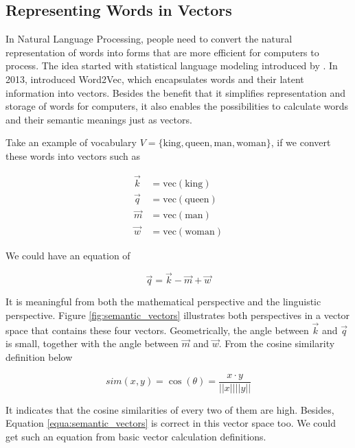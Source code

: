 \documentclass[thesis,fonts=libertine]{cluu}
\begin{document}
\subsection{Representing Words in Vectors}

In Natural Language Processing, people need to convert the natural representation of words into forms that are more efficient for computers to process. The idea started with statistical language modeling introduced by \cite{bengio2003neural}. In 2013, \cite{Mikolov:2013aa} introduced Word2Vec, which encapsulates words and their latent information into vectors. Besides the benefit that it simplifies representation and storage of words for computers, it also enables the possibilities to calculate words and their semantic meanings just as vectors.

Take an example of vocabulary $V=\{\text{king}, \text{queen}, \text{man}, \text{woman}\}$, if we convert these words into vectors such as 

\begin{align*}
  \vec{k} &= \text{vec}(\text{king})\\
  \vec{q} &= \text{vec}(\text{queen})\\
  \vec{m} &= \text{vec}(\text{man})\\
  \vec{w} &= \text{vec}(\text{woman})
\end{align*}

We could have an equation of 

\begin{equation}
  \label{equa:semantic_vectors}
  \vec{q}=\vec{k}-\vec{m}+\vec{w}
\end{equation}

It is meaningful from both the mathematical perspective and the linguistic perspective. Figure \ref{fig:semantic_vectors} illustrates both perspectives in a vector space that contains these four vectors. Geometrically, the angle between $\vec{k}$ and $\vec{q}$ is small, together with the angle between $\vec{m}$ and $\vec{w}$. From the cosine similarity definition below

\begin{equation*}
  sim(x, y) = \cos(\theta) = \frac{x \cdot y}{||x||||y||}
\end{equation*}

It indicates that the cosine similarities of every two of them are high. Besides, Equation \ref{equa:semantic_vectors} is correct in this vector space too. We could get such an equation from basic vector calculation definitions.
\end{document}
